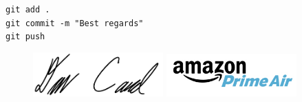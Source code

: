 \vspace{0.25in}
\texttt{git add .}\\
\texttt{git commit -m "Best regards"}\\
\texttt{git push}

\begin{figure}[h]
    \centering
    \begin{minipage}[h]{0.5\linewidth}
        \includegraphics[width=5cm, left]{photos/signature}
    \end{minipage}%
    \begin{minipage}[h]{0.5\linewidth}
        \includegraphics[width=5cm, right]{photos/<COMPANY-PHOTO>-logo}
    \end{minipage}
\end{figure}
